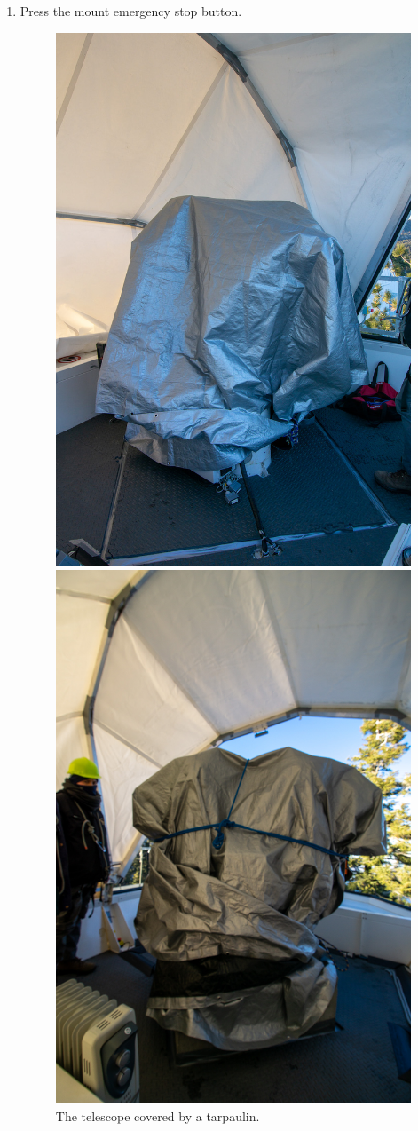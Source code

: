 \begin{enumerate}
\item
Press the mount emergency stop button.

\begin{figure}
\ifcoatli
\begin{center}
\includegraphics[width=0.65\linewidth]{figures/tarpaulin-coatli.jpg}
\end{center}
\caption{The telescope covered by a tarpaulin.}
\fi
\ifddoti
\begin{center}
\includegraphics[width=0.45\linewidth]{figures/tarpaulin-ddoti.jpg}

\end{center}
\end{figure}
\end{enumerate}
